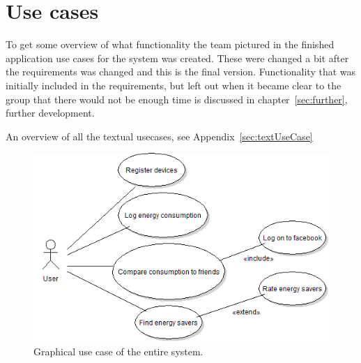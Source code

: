 \section{Use cases}
To get some overview of what functionality the team pictured in the finished application \glspl{use case} for the system was created. These were changed a bit after the requirements was changed and this is the final version. Functionality that was initially included in the requirements, but left out when it became clear to the group that there would not be enough time is discussed in chapter~\ref{sec:further}, further development.


An overview of all the textual usecases, see Appendix~\ref{sec:textUseCase}


\begin{figure}[H]
\includegraphics[width=\textwidth]{ch/specification/fig/currentUsecase.PNG}
\caption{Graphical use case of the entire system.}
\label{fig:usecase}
\end{figure}
